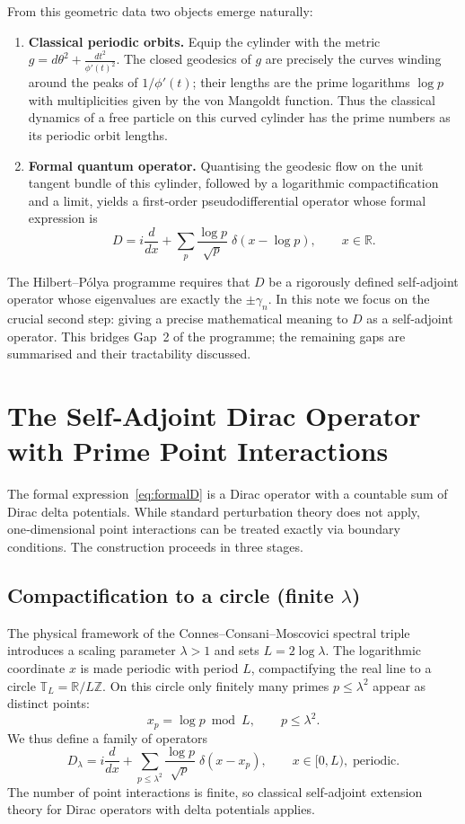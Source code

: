 \documentclass[12pt,a4paper]{article}
\newcommand{\R}{\mathbb{R}}
\newcommand{\Z}{\mathbb{Z}}
\begin{document}
From this geometric data two objects emerge naturally:
\begin{enumerate}
\item \textbf{Classical periodic orbits.}  Equip the cylinder with the metric \(g = d\theta^2 + \frac{dt^2}{\phi'(t)^2}\).  The closed geodesics of \(g\) are precisely the curves winding around the peaks of \(1/\phi'(t)\); their lengths are the prime logarithms \(\log p\) with multiplicities given by the von Mangoldt function.  Thus the classical dynamics of a free particle on this curved cylinder has the prime numbers as its periodic orbit lengths.
\item \textbf{Formal quantum operator.}  Quantising the geodesic flow on the unit tangent bundle of this cylinder, followed by a logarithmic compactification and a limit, yields a first‑order pseudodifferential operator whose formal expression is
\[
D = i\frac{d}{dx} + \sum_{p} \frac{\log p}{\sqrt{p}}\;\delta(x - \log p), \qquad x \in \R .
\]
\end{enumerate}
The Hilbert–Pólya programme requires that \(D\) be a rigorously defined self‑adjoint operator whose eigenvalues are exactly the \(\pm\gamma_n\).  In this note we focus on the crucial second step: giving a precise mathematical meaning to \(D\) as a self‑adjoint operator.  This bridges Gap~2 of the programme; the remaining gaps are summarised and their tractability discussed.

\section{The Self‑Adjoint Dirac Operator with Prime Point Interactions}

The formal expression~\eqref{eq:formalD} is a Dirac operator with a countable sum of Dirac delta potentials.  While standard perturbation theory does not apply, one‑dimensional point interactions can be treated exactly via boundary conditions.  The construction proceeds in three stages.

\subsection{Compactification to a circle (finite \(\lambda\))}

The physical framework of the Connes–Consani–Moscovici spectral triple~\cite{CCM2025} introduces a scaling parameter \(\lambda>1\) and sets \(L = 2\log\lambda\).  The logarithmic coordinate \(x\) is made periodic with period \(L\), compactifying the real line to a circle \(\mathbb{T}_L = \R / L\Z\).  On this circle only finitely many primes \(p \le \lambda^2\) appear as distinct points:
\[
x_p = \log p \bmod L, \qquad p \le \lambda^2 .
\]
We thus define a family of operators
\[
D_\lambda = i\frac{d}{dx} + \sum_{p \le \lambda^2} \frac{\log p}{\sqrt{p}}\;\delta(x - x_p), \qquad x \in [0,L),\; \text{periodic}.
\tag{1}
\]
The number of point interactions is finite, so classical self‑adjoint extension theory for Dirac operators with delta potentials applies.
\end{document}
